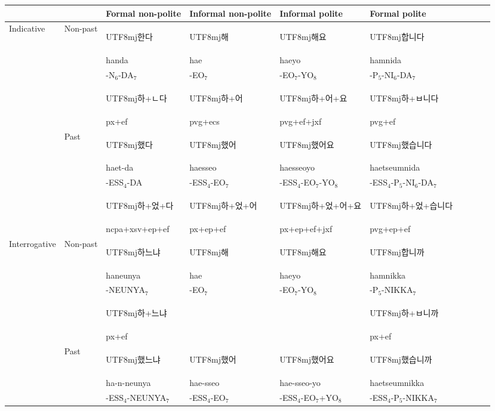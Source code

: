 \documentclass[11pt,letterpaper]{article}
\newcommand{\korean}[1]{\begin{CJK}{UTF8}{mj}#1\end{CJK}}
\begin{document}
\begin{table}
\begin{tabular}{llllllllll}
           &          &Formal non-polite & Informal non-polite & Informal polite & Formal polite \\ \hline \hline
\multirow{6}{*}{Indicative} & \multirow{3}{*}{Non-past} & \korean{한다} & \korean{해}  & \korean{해요}  & \korean{합니다}  \\
           &          & handa & hae & haeyo &  hamnida \\
           &          & -N$_6$-DA$_7$ & -EO$_7$ & -EO$_7$-YO$_8$ &  -P$_5$-NI$_6$-DA$_7$ \\
           &          & \korean{하+ㄴ다}  & \korean{하+어}    & \korean{하+어+요} & \korean{하+ㅂ니다} \\
            &          &  px+ef        &   pvg+ecs        & pvg+ef+jxf & pvg+ef\\
           \hline
           & \multirow{3}{*}{Past}     & \korean{했다}  & \korean{했어} & \korean{했어요}   & \korean{했습니다}  \\
           &      & haet-da &  haesseo &  haesseoyo  & haetseumnida \\
           &      & -ESS$_4$-DA &  -ESS$_4$-EO$_7$ &  -ESS$_4$-EO$_7$-YO$_8$  & -ESS$_4$-P$_5$-NI$_6$-DA$_7$ \\
           &      &  \korean{하+었+다}  &  \korean{하+었+어} & \korean{하+었+어+요} & \korean{하+었+습니다}  \\
           &      &  ncpa+xsv+ep+ef   & px+ep+ef   &   px+ep+ef+jxf &     pvg+ep+ef\\
           \hline
\multirow{6}{*}{Interrogative} & \multirow{3}{*}{Non-past} & \korean{하느냐} & \korean{해}  & \korean{해요}  & \korean{합니까} \\
 &  & haneunya &  hae &  haeyo & hamnikka\\
 &  & -NEUNYA$_7$ &  -EO$_7$ &  -EO$_7$-YO$_8$ & -P$_5$-NIKKA$_7$ \\
               && \korean{하+느냐} & & & \korean{하+ㅂ니까}    \\
              && px+ef & & & px+ef \\
 \hline
              & \multirow{3}{*}{Past} & \korean{했느냐} & \korean{했어} & \korean{했어요} & \korean{했습니까} \\
              &  & ha-n-neunya &  hae-sseo &  hae-sseo-yo &  haetseumnikka\\
              &  & -ESS$_4$-NEUNYA$_7$ &  -ESS$_4$-EO$_7$ &  -ESS$_4$-EO$_7$+YO$_8$ &  -ESS$_4$-P$_5$-NIKKA$_7$\\

\end{tabular}
\end{table}
\end{document}
